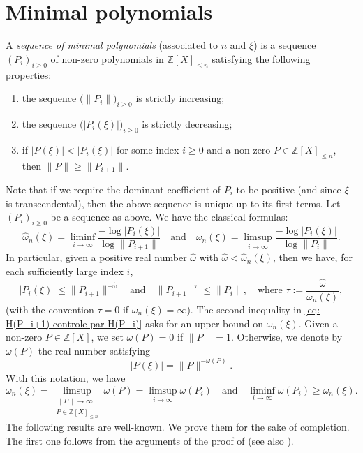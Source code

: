 \documentclass[10pt,a4paper]{amsart}
\numberwithin{equation}{section}
\newcommand\bZ{\mathbb{Z}}
\newcommand\homega{\widehat{\omega}}\newcommand\HH{\mathcal{H}}
\newcommand{\normH}[1]{\|#1\|}
\newcommand\AND{\quad\text{and}\quad}
\theoremstyle{definition}
\theoremstyle{plain}
\begin{document}
\section{Minimal polynomials}
\label{section: minimal pol}

A \emph{sequence of minimal polynomials} (associated to $n$ and $\xi$) is a sequence $(P_i)_{i\geq 0}$ of non-zero polynomials in $\bZ[X]_{\leq n}$ satisfying the following properties:
\begin{enumerate}
\item the sequence $\big(\normH{P_i}\big)_{i\geq 0}$ is strictly increasing;
\item the sequence $\big(|P_i(\xi)|\big)_{i\geq 0}$ is strictly decreasing;
\item if $|P(\xi)| < |P_i(\xi)|$ for some index $i\geq 0$ and a non-zero $P\in\bZ[X]_{\leq n}$, then $\normH{P}\geq \normH{P_{i+1}}$.
\end{enumerate}

Note that if we require the dominant coefficient of $P_i$ to be positive (and since $\xi$ is transcendental), then the above sequence is unique up to its first terms. Let $(P_i)_{i\geq 0}$ be a sequence as above. We have the classical formulas:
\begin{equation}
\label{eq: exposant via minimal points}
\homega_n(\xi) = \liminf_{i\to \infty} \frac{-\log |P_i(\xi)|}{\log \normH{P_{i+1}}} \AND \omega_n(\xi) = \limsup_{i\to \infty} \frac{-\log |P_i(\xi)|}{\log \normH{P_{i}}}.
\end{equation}
In particular, given a positive real number $\homega$ with $\homega < \homega_n(\xi)$, then we have, for each sufficiently large index $i$,
\begin{equation}
\label{eq: H(P_i+1) controle par H(P_i)}
|P_i(\xi)| \leq \normH{P_{i+1}}^{-\homega} \AND \normH{P_{i+1}}^\tau \leq \normH{P_i},\quad \textrm{where } \tau:= \frac{\homega}{\omega_n(\xi)},
\end{equation}
(with the convention $\tau = 0$ if $\omega_n(\xi) = \infty$). The second inequality in \eqref{eq: H(P_i+1) controle par H(P_i)} asks for an upper bound on $\omega_n(\xi)$. Given a non-zero $P \in \bZ[X]$, we set $\omega(P)=0$ if $\normH{P} = 1$. Otherwise, we denote by $\omega(P)$ the real number satisfying
\[
|P(\xi)| = \normH{P}^{-\omega(P)}.
\]
With this notation, we have
\begin{equation}
\label{eq: encadrement omega(P_i)}
\omega_n(\xi) = \limsup_{\substack{\normH{P}\to \infty \\ P\in\bZ[X]_{\leq n}}} \omega(P) = \limsup_{i\to \infty} \omega(P_i) \AND \liminf_{i\to \infty} \omega(P_i) \geq \homega_n(\xi).
\end{equation}
The following results are well-known. We prove them for the sake of completion. The first one follows from the arguments of the proof of \cite[Lem.\,2]{davenport1967approximation} (see also \cite[Lem.\,4.1]{roy2004approximation}).
\end{document}
